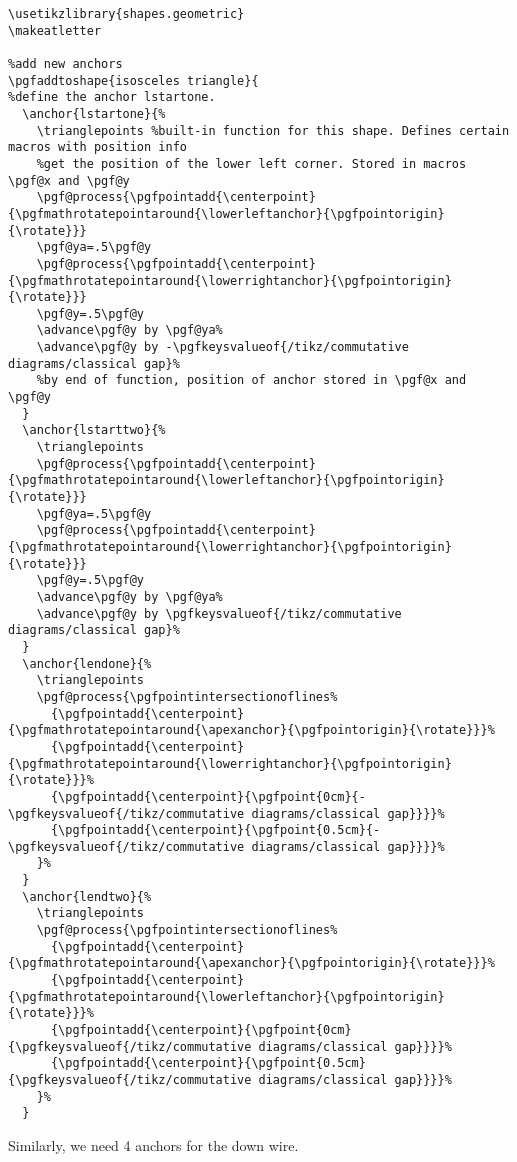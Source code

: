 \documentclass[aps,pra,10pt,nofootinbib]{revtex4-2}
\begin{document}
\begin{FullCode}
\begin{lstlisting}
\usetikzlibrary{shapes.geometric}
\makeatletter

%add new anchors
\pgfaddtoshape{isosceles triangle}{
%define the anchor lstartone.
  \anchor{lstartone}{%
    \trianglepoints %built-in function for this shape. Defines certain macros with position info
    %get the position of the lower left corner. Stored in macros \pgf@x and \pgf@y
    \pgf@process{\pgfpointadd{\centerpoint}{\pgfmathrotatepointaround{\lowerleftanchor}{\pgfpointorigin}{\rotate}}}
    \pgf@ya=.5\pgf@y
    \pgf@process{\pgfpointadd{\centerpoint}{\pgfmathrotatepointaround{\lowerrightanchor}{\pgfpointorigin}{\rotate}}}
    \pgf@y=.5\pgf@y
    \advance\pgf@y by \pgf@ya%
    \advance\pgf@y by -\pgfkeysvalueof{/tikz/commutative diagrams/classical gap}%
    %by end of function, position of anchor stored in \pgf@x and \pgf@y
  }
  \anchor{lstarttwo}{%
    \trianglepoints
    \pgf@process{\pgfpointadd{\centerpoint}{\pgfmathrotatepointaround{\lowerleftanchor}{\pgfpointorigin}{\rotate}}}
    \pgf@ya=.5\pgf@y
    \pgf@process{\pgfpointadd{\centerpoint}{\pgfmathrotatepointaround{\lowerrightanchor}{\pgfpointorigin}{\rotate}}}
    \pgf@y=.5\pgf@y
    \advance\pgf@y by \pgf@ya%
    \advance\pgf@y by \pgfkeysvalueof{/tikz/commutative diagrams/classical gap}%
  }
  \anchor{lendone}{%
    \trianglepoints
    \pgf@process{\pgfpointintersectionoflines%
      {\pgfpointadd{\centerpoint}{\pgfmathrotatepointaround{\apexanchor}{\pgfpointorigin}{\rotate}}}%
      {\pgfpointadd{\centerpoint}{\pgfmathrotatepointaround{\lowerrightanchor}{\pgfpointorigin}{\rotate}}}%
      {\pgfpointadd{\centerpoint}{\pgfpoint{0cm}{-\pgfkeysvalueof{/tikz/commutative diagrams/classical gap}}}}%
      {\pgfpointadd{\centerpoint}{\pgfpoint{0.5cm}{-\pgfkeysvalueof{/tikz/commutative diagrams/classical gap}}}}%
    }%
  }
  \anchor{lendtwo}{%
    \trianglepoints
    \pgf@process{\pgfpointintersectionoflines%
      {\pgfpointadd{\centerpoint}{\pgfmathrotatepointaround{\apexanchor}{\pgfpointorigin}{\rotate}}}%
      {\pgfpointadd{\centerpoint}{\pgfmathrotatepointaround{\lowerleftanchor}{\pgfpointorigin}{\rotate}}}%
      {\pgfpointadd{\centerpoint}{\pgfpoint{0cm}{\pgfkeysvalueof{/tikz/commutative diagrams/classical gap}}}}%
      {\pgfpointadd{\centerpoint}{\pgfpoint{0.5cm}{\pgfkeysvalueof{/tikz/commutative diagrams/classical gap}}}}%
    }%
  }
  \end{lstlisting}
  \end{FullCode}
  Similarly, we need 4 anchors for the down wire.
\end{document}
